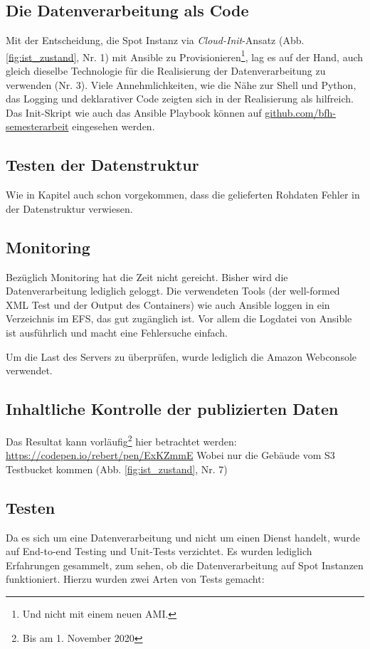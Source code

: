 \subsection{Die Datenverarbeitung als Code}
Mit der Entscheidung, die Spot Instanz via \emph{Cloud-Init}-Ansatz (Abb. \ref{fig:ist_zustand}, Nr. 1) mit Ansible zu Provisionieren\footnote{Und nicht mit einem neuen AMI.}, lag es auf der Hand, auch gleich dieselbe Technologie für die Realisierung der Datenverarbeitung zu verwenden (Nr. 3). 
Viele Annehmlichkeiten, wie die Nähe zur Shell und Python, das Logging und deklarativer Code zeigten sich in der Realisierung als hilfreich. Das Init-Skript wie auch das Ansible Playbook können auf \href{https://github.com/bfh-semesterarbeit/up-and-running-dataprocessing}{github.com/bfh-semesterarbeit} eingesehen werden.


\subsection{Testen der Datenstruktur}
Wie in Kapitel auch schon vorgekommen, dass die gelieferten Rohdaten Fehler in der Datenstruktur verwiesen.

\subsection{Monitoring}
Bezüglich Monitoring hat die Zeit nicht gereicht. Bisher wird die Datenverarbeitung lediglich geloggt. Die verwendeten Tools (der well-formed XML Test und der Output des Containers) wie auch Ansible loggen in ein Verzeichnis im EFS, das gut zugänglich ist. Vor allem die Logdatei von Ansible ist ausführlich und macht eine Fehlersuche einfach.

Um die Last des Servers zu überprüfen, wurde lediglich die Amazon Webconsole verwendet.


\subsection{Inhaltliche Kontrolle der publizierten Daten}
Das Resultat kann vorläufig\footnote{Bis am 1. November 2020} hier betrachtet werden:
\href{https://codepen.io/rebert/pen/ExKZmmE}{https://codepen.io/rebert/pen/ExKZmmE} Wobei nur die Gebäude vom S3 Testbucket kommen (Abb. \ref{fig:ist_zustand}, Nr. 7) 

\subsection{Testen}
Da es sich um eine Datenverarbeitung und nicht um einen Dienst handelt, wurde auf End-to-end Testing und Unit-Tests verzichtet. Es wurden lediglich Erfahrungen gesammelt, zum sehen, ob die Datenverarbeitung auf Spot Instanzen funktioniert. Hierzu wurden zwei Arten von Tests gemacht:

